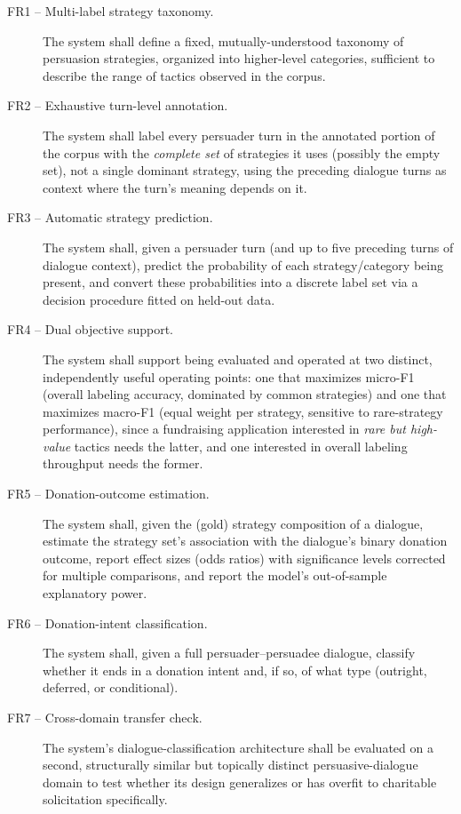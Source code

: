 \begin{description}
\item[FR1 -- Multi-label strategy taxonomy.] The system shall define a
  fixed, mutually-understood taxonomy of persuasion strategies, organized
  into higher-level categories, sufficient to describe the range of tactics
  observed in the corpus.
\item[FR2 -- Exhaustive turn-level annotation.] The system shall label every
  persuader turn in the annotated portion of the corpus with the
  \emph{complete set} of strategies it uses (possibly the empty set), not a
  single dominant strategy, using the preceding dialogue turns as context
  where the turn's meaning depends on it.
\item[FR3 -- Automatic strategy prediction.] The system shall, given a
  persuader turn (and up to five preceding turns of dialogue context),
  predict the probability of each strategy/category being present, and
  convert these probabilities into a discrete label set via a
  decision procedure fitted on held-out data.
\item[FR4 -- Dual objective support.] The system shall support being
  evaluated and operated at two distinct, independently useful operating
  points: one that maximizes micro-F1 (overall labeling accuracy, dominated
  by common strategies) and one that maximizes macro-F1 (equal weight per
  strategy, sensitive to rare-strategy performance), since a fundraising
  application interested in \emph{rare but high-value} tactics needs the
  latter, and one interested in overall labeling throughput needs the
  former.
\item[FR5 -- Donation-outcome estimation.] The system shall, given the
  (gold) strategy composition of a dialogue, estimate the strategy set's
  association with the dialogue's binary donation outcome, report effect
  sizes (odds ratios) with significance levels corrected for multiple
  comparisons, and report the model's out-of-sample explanatory power.
\item[FR6 -- Donation-intent classification.] The system shall, given a full
  persuader--persuadee dialogue, classify whether it ends in a donation
  intent and, if so, of what type (outright, deferred, or conditional).
\item[FR7 -- Cross-domain transfer check.] The system's dialogue-classification
  architecture shall be evaluated on a second, structurally similar but
  topically distinct persuasive-dialogue domain to test whether its design
  generalizes or has overfit to charitable solicitation specifically.
\end{description}

